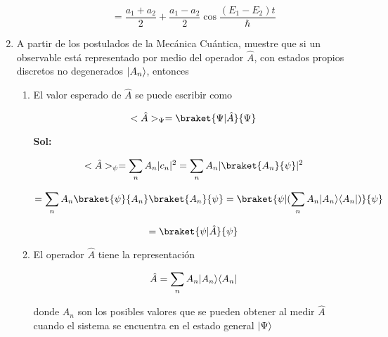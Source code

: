 \documentclass[12pt,a4paper]{article}
\DeclarePairedDelimiter\bra{\langle}{\rvert}
\DeclarePairedDelimiter\ket{\lvert}{\rangle}
\begin{document}
\begin{enumerate}
\begin{enumerate}
    \begin{equation*}
        = \frac{a_1 +a_2}{2} + \frac{a_1 - a_2}{2} \cos{\frac{(E_1 - E_2)t}{\hbar}}
    \end{equation*}
    
    
    
\end{enumerate}






\item A partir de los postulados de la Mecánica Cuántica, muestre que si un observable está representado por medio del operador $\hat{A}$, con estados propios discretos no degenerados $\ket{A_n}$, entonces 

\begin{enumerate}
    \item El valor esperado de $\hat{A}$ se puede escribir como
    
    \begin{equation*}
        <\hat{A}>_{\Psi} = \braket{\Psi|\hat{A}}{\Psi}
    \end{equation*}
    
    \textbf{Sol:}
    
    \begin{equation*}
        <\hat{A}>_{\psi} = \sum_{n} A_n |c_n|^2 = \sum_{n} A_n |\braket{A_n}{\psi}|^2
    \end{equation*}
    
    \begin{equation*}
        = \sum_{n} A_n \braket{\psi}{A_n} \braket{A_n}{\psi} = \braket{\psi | (\sum_{n} A_n \ket{A_n} \bra{A_n})}{\psi}
    \end{equation*}
    
    \begin{equation*}
        = \braket{\psi | \hat{A}}{\psi}
    \end{equation*}
    
    \item El operador $\hat{A}$ tiene la representación
    
    \begin{equation*}
        \hat{A} = \sum_{n} A_n \ket{A_n} \bra{A_n}
    \end{equation*}
    
    donde $A_n$ son los posibles valores que se pueden obtener al medir $\hat{A}$ cuando el sistema se encuentra en el estado general $\ket{\Psi}$
    

\end{enumerate}
\end{enumerate}
\end{document}
